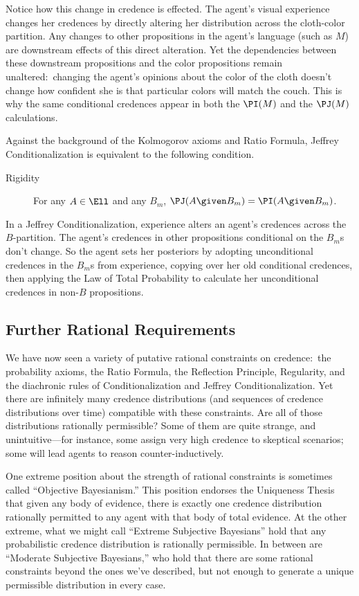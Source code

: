 Notice how this change in credence is effected. The agent's visual experience changes her credences by directly altering her distribution across the cloth-color partition. Any changes to other propositions in the agent's language (such as $M$) are downstream effects of this direct alteration. Yet the dependencies between these downstream propositions and the color propositions remain unaltered:\ changing the agent's opinions about the color of the cloth doesn't change how confident she is that particular colors will match the couch. This is why the same conditional credences appear in both the $\PI(M)$ and the $\PJ(M)$ calculations.

Against the background of the Kolmogorov axioms and Ratio Formula, Jeffrey Conditionalization is equivalent to the following condition.
\begin{description}
\item[Rigidity]{For any $A \in \Ell$ and any $B_m$, $\PJ(A \given B_m)=\PI(A \given B_m)$.}
\end{description}
In a Jeffrey Conditionalization, experience alters an agent's credences across the $B$-partition. The agent's credences in other propositions conditional on the $B_m$s don't change. So the agent sets her posteriors by adopting unconditional credences in the $B_m$s from experience, copying over her old conditional credences, then applying the Law of Total Probability to calculate her unconditional credences in non-$B$ propositions.

\subsection{Further Rational Requirements} \label{ss:further}
We have now seen a variety of putative rational constraints on credence:\ the probability axioms, the Ratio Formula, the Reflection Principle, Regularity, and the diachronic rules of Conditionalization and Jeffrey Conditionalization. Yet there are infinitely many credence distributions (and sequences of credence distributions over time) compatible with these constraints. Are all of those distributions rationally permissible?
Some of them are quite strange, and unintuitive---for instance, some assign very high credence to skeptical scenarios; some will lead agents to reason counter-inductively.

One extreme position about the strength of rational constraints is sometimes called ``Objective Bayesianism.'' This position endorses the Uniqueness Thesis \citep{FeldmanDisagreements,WhitePermissiveness} that given any body of evidence, there is exactly one credence distribution rationally permitted to any agent with that body of total evidence. At the other extreme, what we might call ``Extreme Subjective Bayesians'' hold that any probabilistic credence distribution is rationally permissible. In between are ``Moderate Subjective Bayesians,'' who hold that there are some rational constraints beyond the ones we've described, but not enough to generate a unique permissible distribution in every case.

